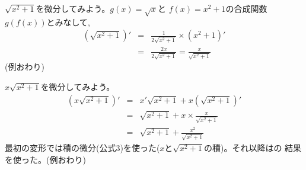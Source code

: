 \begin{exmpl}\label{exmpl:diff_sqrtx2p1} $\sqrt{x^2+1}$を微分してみよう。$g(x)=\sqrt{x}$と
$f(x)=x^2+1$の合成関数$g(f(x))$とみなして, 
\begin{eqnarray}
(\sqrt{x^2+1})'&=&\frac{1}{2\sqrt{x^2+1}}\times(x^2+1)'\nonumber\\
                &=&\frac{2x}{2\sqrt{x^2+1}}=\frac{x}{\sqrt{x^2+1}}\label{eq:exmpl_diff_23}
\end{eqnarray}
(例おわり)\end{exmpl}

\begin{exmpl} $x\sqrt{x^2+1}$を微分してみよう。
\begin{eqnarray}
(x\sqrt{x^2+1})'&=&x'\sqrt{x^2+1}+x(\sqrt{x^2+1})'\nonumber\\
                &=&\sqrt{x^2+1}+x\times\frac{x}{\sqrt{x^2+1}}\nonumber\\
                &=&\sqrt{x^2+1}+\frac{x^2}{\sqrt{x^2+1}}
\end{eqnarray}
最初の変形では積の微分(公式3)を使った($x$と$\sqrt{x^2+1}$の積)。それ以降はの
結果を使った。(例おわり)\end{exmpl}
\mv

\begin{freqmiss}{\small{}}\end{freqmiss}
\mv

